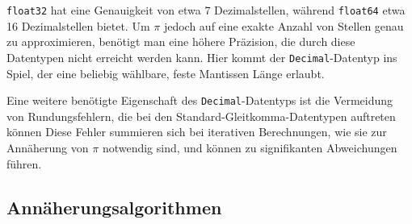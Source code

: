 \documentclass{scrartcl}
\theoremstyle{definition}
\newtheorem{approximation sequence}{Annäherungsfolge}
\begin{document}
\texttt{float32} hat eine Genauigkeit von etwa 7 Dezimalstellen, während
\texttt{float64} etwa 16 Dezimalstellen bietet.
Um \(\pi\) jedoch auf eine exakte Anzahl von Stellen genau zu approximieren,
benötigt man eine höhere Präzision, die durch diese Datentypen nicht erreicht
werden kann.
Hier kommt der \texttt{Decimal}-Datentyp ins Spiel, der eine beliebig wählbare,
feste Mantissen Länge erlaubt.

Eine weitere benötigte Eigenschaft des \texttt{Decimal}-Datentyps ist die
Vermeidung von Rundungsfehlern, die bei den Standard-Gleitkomma-Datentypen
auftreten können Diese Fehler summieren sich bei iterativen Berechnungen, wie
sie zur Annäherung von \(\pi\) notwendig sind, und können zu signifikanten
Abweichungen führen.

\subsection{Annäherungsalgorithmen}
\end{document}
